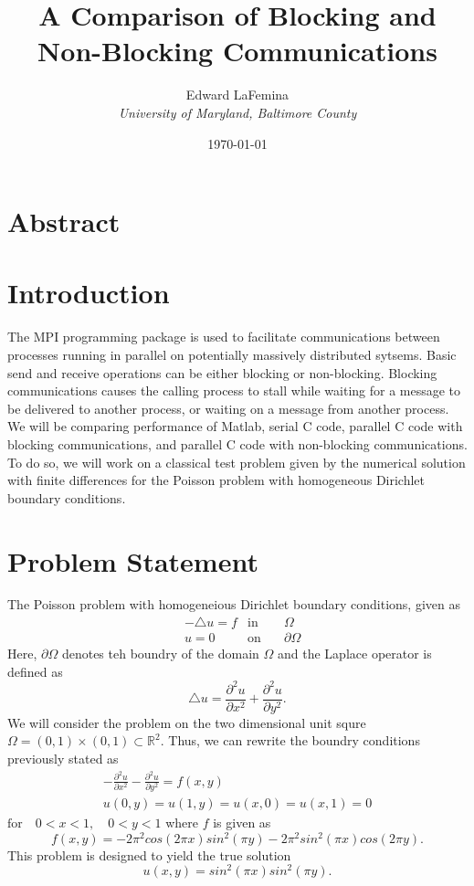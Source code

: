 \documentclass[11pt]{article}
\author{Edward LaFemina \\
		\it{University of Maryland, Baltimore County}}
\title{A Comparison of Blocking and Non-Blocking Communications}
\date{\today}
\begin{document}
\maketitle

\section*{Abstract}

\section{Introduction}
The MPI programming package is used to facilitate communications between processes running in parallel on potentially massively distributed sytsems. Basic send and receive operations can be either blocking or non-blocking. Blocking communications causes the calling process to stall while waiting for a message to be delivered to another process, or waiting on a message from another process. We will be comparing performance of Matlab, serial C code, parallel C code with blocking communications, and parallel C code with non-blocking communications. To do so, we will work on a classical test problem given by the numerical solution with finite differences for the Poisson problem with homogeneous Dirichlet boundary conditions.

\section{Problem Statement}
The Poisson problem with homogeneious Dirichlet boundary conditions, given as
\begin{align*}
&-\triangle u=f &\text{in}\hspace{1em}& \Omega\\
&u=0            &\text{on}\hspace{1em}& \partial\Omega
\end{align*}
Here, $\partial\Omega$ denotes teh boundry of the domain $\Omega$ and the Laplace operator is defined as
$$\triangle u=\frac{\partial ^2 u}{\partial x^2}+\frac{\partial ^2 u}{\partial y^2}.$$
We will consider the problem on the two dimensional unit squre $\Omega=(0,1)\times (0,1)\subset \mathbb{R}^2$. Thus, we can rewrite the boundry conditions previously stated as
\begin{align*}
&-\frac{\partial ^2 u}{\partial x^2}-\frac{\partial ^2 u}{\partial y^2}=f(x,y)&\\
&u(0,y)=u(1,y)=u(x,0)=u(x,1)=0 &
\end{align*}
$\text{for}\hspace{1em} 0<x<1,\hspace{1em} 0<y<1$ where $f$ is given as
$$f(x,y)=-2\pi ^2 cos(2\pi x)sin^2 (\pi y)-2\pi ^2 sin^2(\pi x)cos(2\pi y).$$
This problem is designed to yield the true solution
$$u(x,y)=sin^2 (\pi x)sin^2 (\pi y).$$
\end{document}

